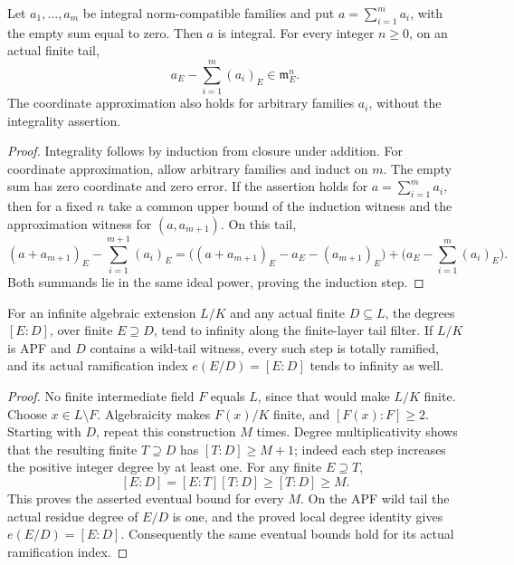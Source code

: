 \begin{lemma}
\label{fw:norm-limit-finite-sum-approximation}
\leanok
Let $a_1,\ldots,a_m$ be integral norm-compatible families and put
$a=\sum_{i=1}^m a_i$, with the empty sum equal to zero.
Then $a$ is integral. For every integer $n\geq0$, on an actual
finite tail,
\[
 a_E-\sum_{i=1}^m(a_i)_E\in\mathfrak m_E^n.
\]
The coordinate approximation also holds for arbitrary families $a_i$,
without the integrality assertion.
\end{lemma}
\begin{proof}
Integrality follows by induction from closure under addition.
For coordinate approximation, allow arbitrary families and induct on $m$.
The empty sum has zero coordinate and zero error.
If the assertion holds for $a=\sum_{i=1}^m a_i$, then for a fixed
$n$ take a common upper bound
of the induction witness and the approximation witness for $(a,a_{m+1})$.
On this tail,
\[
 (a+a_{m+1})_E-\sum_{i=1}^{m+1}(a_i)_E
 =\bigl((a+a_{m+1})_E-a_E-(a_{m+1})_E\bigr)
  +\bigl(a_E-\sum_{i=1}^m(a_i)_E\bigr).
\]
Both summands lie in the same ideal power, proving the induction step.
\end{proof}

\begin{lemma}
\label{fw:apf-unbounded-finite-ramification}
\leanok
For an infinite algebraic extension $L/K$ and any actual finite
$D\subseteq L$, the degrees $[E:D]$, over finite $E\supseteq D$,
tend to infinity along the finite-layer tail filter.
If $L/K$ is APF and $D$ contains a wild-tail witness, every such
step is totally ramified, and its actual ramification index
$e(E/D)=[E:D]$ tends to infinity as well.
\end{lemma}
\begin{proof}
No finite intermediate field $F$ equals $L$, since that would make
$L/K$ finite. Choose $x\in L\setminus F$. Algebraicity makes $F(x)/K$
finite, and $[F(x):F]\geq2$. Starting with $D$, repeat this construction
$M$ times. Degree multiplicativity shows that the resulting finite
$T\supseteq D$ has $[T:D]\geq M+1$; indeed each step increases the
positive integer degree by at least one. For any finite $E\supseteq T$,
\[
 [E:D]=[E:T][T:D]\geq[T:D]\geq M.
\]
This proves the asserted eventual bound for every $M$.
On the APF wild tail the actual residue degree of $E/D$ is one,
and the proved local degree identity gives $e(E/D)=[E:D]$.
Consequently the same eventual bounds hold for its actual
ramification index.
\end{proof}


